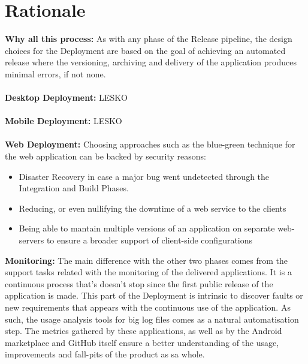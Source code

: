 \documentclass[12pt]{report}
\begin{document}
\section{Rationale}
\textbf{Why all this process:} As with any phase of the Release pipeline, the design choices for the Deployment are based on the goal of achieving an automated release where the versioning, archiving and delivery of the application produces minimal errors, if not none.\\\\
\textbf{Desktop Deployment:} LESKO\\\\
\textbf{Mobile Deployment:} LESKO\\\\
\textbf{Web Deployment:} Choosing approaches such as the blue-green technique for the web application can be backed by security reasons: 
\begin{itemize}
    \item Disaster Recovery in case a major bug went undetected through the Integration and Build Phases.
    \item Reducing, or even nullifying the downtime of a web service to the clients
    \item Being able to mantain multiple versions of an application on separate web-servers to ensure a broader support of client-side configurations
\end{itemize}
\textbf{Monitoring:} The main difference with the other two phases comes from the support tasks
related with the monitoring of the delivered applications. It is a continuous process that's doesn't
stop since the first public release of the application is made. This part of the Deployment is
intrinsic to discover faults or new requirements that appears with the continuous use of the
application. As such, the usage analysis tools for big log files comes as a natural automatisation
step. The metrics gathered by these applications, as well as by the Android marketplace and GitHub
itself ensure a better understanding of the usage, improvements and fall-pits of the product as sa
whole.
\end{document}
